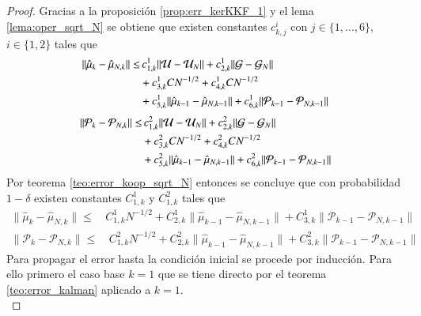 \begin{proof}
	Gracias a la proposición \ref{prop:err_kerKKF_1} y el lema \ref{lema:oper_sqrt_N} se obtiene que existen constantes $c_{k,j}^i$ con $j \in \{ 1, \dots, 6\}$, $i \in \{ 1, 2\}$ tales que
	\begin{equation*}
		\begin{aligned}
			\| \hat \mu_{k} - \hat \mu_{N,k}  \| \leq & \, c_{1,k}^1 \| \mathcal{U} - \mathcal{U}_N \| +  c_{2,k}^1 \| \mathcal{G} - \mathcal{G}_N \| \\ 
			&+ c_{3,k}^1 C N^{-1/2}+c_{4,k}^1 C N^{-1/2} \\
			& + c_{5,k}^1 \| \hat \mu_{k-1} - \hat \mu_{N, k-1} \| + c_{6,k}^1 \| \mathcal{P}_{k-1} - \mathcal{P}_{N, k-1} \|
		\end{aligned}
		\label{}
	\end{equation*}
	\begin{equation*}
		\begin{aligned}
			\| \mathcal{P}_{k} - \mathcal{P}_{N,k} \| \leq & \, c_{1,k}^2 \| \mathcal{U} - \mathcal{U}_N \| +  c_{2,k}^2 \| \mathcal{G} - \mathcal{G}_N \| \\ 
			&+ c_{3,k}^2 C N^{-1/2}+c_{4,k}^2 C N^{-1/2} \\
			& + c_{5,k}^2 \| \hat \mu_{k-1} - \hat \mu_{N, k-1} \| + c_{6,k}^2 \| \mathcal{P}_{k-1} - \mathcal{P}_{N, k-1} \|
		\end{aligned}
	\end{equation*}
	Por teorema \ref{teo:error_koop_sqrt_N} entonces se concluye que con probabilidad $1-\delta$ existen constantes $C^1_{1, k}$ y $C^2_{1, k}$ tales que
	\begin{equation*}
		\begin{aligned}
			\| \hat \mu_{k} - \hat \mu_{N,k}  \| \leq & \, C_{1,k}^1 N^{-1/2} + C_{2,k}^1 \| \hat \mu_{k-1} - \hat \mu_{N, k-1} \| + C_{3,k}^1 \| \mathcal{P}_{k-1}  - \mathcal{P}_{N, k-1}  \|
		\end{aligned}
	\end{equation*}
	\begin{equation*}
		\begin{aligned}
			\| \mathcal{P}_{k} - \mathcal{P}_{N,k}  \| \leq & \, C_{1,k}^2 N^{-1/2} + C_{2,k}^2 \| \hat \mu_{k-1} - \hat \mu_{N, k-1} \| + C_{3,k}^2 \| \mathcal{P}_{k-1} - \mathcal{P}_{N,k-1} \|
		\end{aligned}
	\end{equation*}
	Para propagar el error hasta la condición inicial se procede por inducción. Para ello primero el caso base $k=1$ que se tiene directo por el teorema \ref{teo:error_kalman} aplicado a $k=1$.\\

\end{proof}
